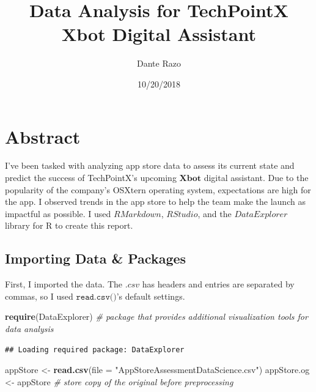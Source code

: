 \documentclass[]{article}
\title{Data Analysis for TechPointX Xbot Digital Assistant}
\author{Dante Razo}
\date{10/20/2018}
\newenvironment{Shaded}{\begin{snugshade}}{\end{snugshade}}
\newcommand{\CommentTok}[1]{\textcolor[rgb]{0.56,0.35,0.01}{\textit{#1}}}
\newcommand{\DataTypeTok}[1]{\textcolor[rgb]{0.13,0.29,0.53}{#1}}
\newcommand{\KeywordTok}[1]{\textcolor[rgb]{0.13,0.29,0.53}{\textbf{#1}}}
\newcommand{\NormalTok}[1]{#1}
\newcommand{\StringTok}[1]{\textcolor[rgb]{0.31,0.60,0.02}{#1}}
\begin{document}
\maketitle

\hypertarget{abstract}{%
\section{Abstract}\label{abstract}}

I've been tasked with analyzing app store data to assess its current
state and predict the success of TechPointX's upcoming \(\textbf{Xbot}\)
digital assistant. Due to the popularity of the company's OSXtern
operating system, expectations are high for the app. I observed trends
in the app store to help the team make the launch as impactful as
possible. I used \(\textit{RMarkdown}\), \(\textit{RStudio}\), and the
\(\textit{DataExplorer}\) library for R to create this report.

\hypertarget{importing-data-packages}{%
\subsection{Importing Data \& Packages}\label{importing-data-packages}}

First, I imported the data. The \(\textit{.csv}\) has headers and
entries are separated by commas, so I used \(\texttt{read.csv()}\)'s
default settings.

\begin{Shaded}
\begin{Highlighting}[]
\KeywordTok{require}\NormalTok{(DataExplorer)  }\CommentTok{# package that provides additional visualization tools for data analysis}
\end{Highlighting}
\end{Shaded}

\begin{verbatim}
## Loading required package: DataExplorer
\end{verbatim}

\begin{Shaded}
\begin{Highlighting}[]
\NormalTok{appStore <-}\StringTok{ }\KeywordTok{read.csv}\NormalTok{(}\DataTypeTok{file =} \StringTok{"AppStoreAssessmentDataScience.csv"}\NormalTok{)}
\NormalTok{appStore.og <-}\StringTok{ }\NormalTok{appStore  }\CommentTok{# store copy of the original before preprocessing}
\end{Highlighting}
\end{Shaded}
\end{document}
